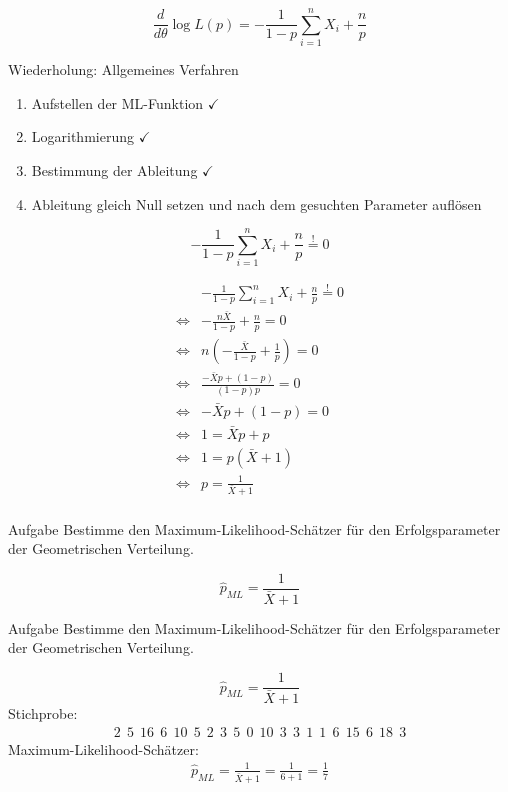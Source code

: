 \documentclass[t,11pt]{beamer}
\begin{document}
\begin{frame}
$$  \frac{d}{d\theta}\log L(p) = -\frac{1}{1-p}\sum_{i=1}^{n} X_i +  \frac{n}{p}$$
\begin{exampleblock}{Wiederholung: Allgemeines Verfahren}
	\begin{enumerate}
		\item Aufstellen der ML-Funktion $\checkmark$
		\item Logarithmierung $\checkmark$
		\item Bestimmung der Ableitung $\checkmark$
		\item Ableitung gleich Null setzen und nach dem gesuchten Parameter auflösen
	\end{enumerate}
\end{exampleblock}
$$   -\frac{1}{1-p}\sum_{i=1}^{n} X_i +  \frac{n}{p} \overset{!}{=} 0$$
\end{frame}

\begin{frame}
	\begin{align*}
		&-\frac{1}{1-p}\sum_{i=1}^{n} X_i +  \frac{n}{p} \overset{!}{=} 0 \\
		\Longleftrightarrow&  -\frac{n\bar{X}}{1-p} +  \frac{n}{p} = 0 \\
		\Longleftrightarrow& n\left(-\frac{\bar{X}}{1-p} +  \frac{1}{p} \right) = 0 \\
		\Longleftrightarrow& \frac{-\bar{X}p+(1-p)}{(1-p)p} = 0 \\
		\Longleftrightarrow& -\bar{X}p+(1-p) = 0 \\
		\Longleftrightarrow& 1 = \bar{X}p+p \\
		\Longleftrightarrow& 1 = p\left(\bar{X}+1\right) \\
		\Longleftrightarrow& p = \frac{1}{\bar{X}+1} \\
	\end{align*}
\end{frame}

\begin{frame}
	\begin{block}{Aufgabe}
		Bestimme den Maximum-Likelihood-Schätzer für den Erfolgsparameter der Geometrischen Verteilung.
	\end{block}
	$$\hat{p}_{ML}=\frac{1}{\bar{X}+1}$$
\end{frame}

\begin{frame}
\begin{block}{Aufgabe}
	Bestimme den Maximum-Likelihood-Schätzer für den Erfolgsparameter der Geometrischen Verteilung.
\end{block}
$$\hat{p}_{ML}=\frac{1}{\bar{X}+1}$$
\vfill
Stichprobe:
\begin{align*}
2 ~~ 5 ~~ 16 ~~ 6 ~~ 10 ~~ 5 ~~ 2 ~~ 3 ~~ 5 ~~ 0 ~~ 10 ~~ 3 ~~ 3 ~~ 1 ~~ 1 ~~ 6 ~~ 15 ~~ 6 ~~ 18 ~~ 3
\end{align*}
\vfill
Maximum-Likelihood-Schätzer:
\begin{align*}
\hat{p}_{ML} = \frac{1}{\bar{X}+1} = \frac{1}{6+1} =  \frac{1}{7}
\end{align*}
\end{frame}
\end{document}
